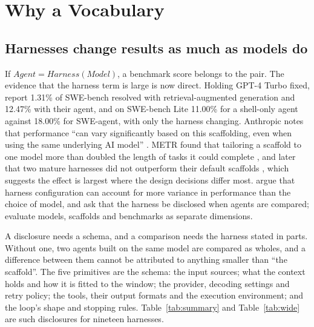 \section{Why a Vocabulary}
\label{sec:vocabulary}

\subsection{Harnesses change results as much as models do}
If $\textit{Agent} = \textit{Harness}(\textit{Model})$, a benchmark score belongs to the pair. The evidence that the harness term is large is now direct. Holding GPT-4 Turbo fixed, \citet{yang2024sweagent} report 1.31\% of SWE-bench \citep{jimenez2024swebench} resolved with retrieval-augmented generation and 12.47\% with their agent, and on SWE-bench Lite 11.00\% for a shell-only agent against 18.00\% for SWE-agent, with only the harness changing. Anthropic notes that performance ``can vary significantly based on this scaffolding, even when using the same underlying AI model'' \citep{anthropic2025swebench}. METR found that tailoring a scaffold to one model more than doubled the length of tasks it could complete \citep{metr2025update}, and later that two mature harnesses did not outperform their default scaffolds \citep{metr2026harness}, which suggests the effect is largest where the design decisions differ most. \citet{zhang2026stop} argue that harness configuration can account for more variance in performance than the choice of model, and ask that the harness be disclosed when agents are compared; \citet{kapoor2025hal} evaluate models, scaffolds and benchmarks as separate dimensions.

A disclosure needs a schema, and a comparison needs the harness stated in parts. Without one, two agents built on the same model are compared as wholes, and a difference between them cannot be attributed to anything smaller than ``the scaffold''. The five primitives are the schema: the input sources; what the context holds and how it is fitted to the window; the provider, decoding settings and retry policy; the tools, their output formats and the execution environment; and the loop's shape and stopping rules. Table~\ref{tab:summary} and Table~\ref{tab:wide} are such disclosures for nineteen harnesses.

